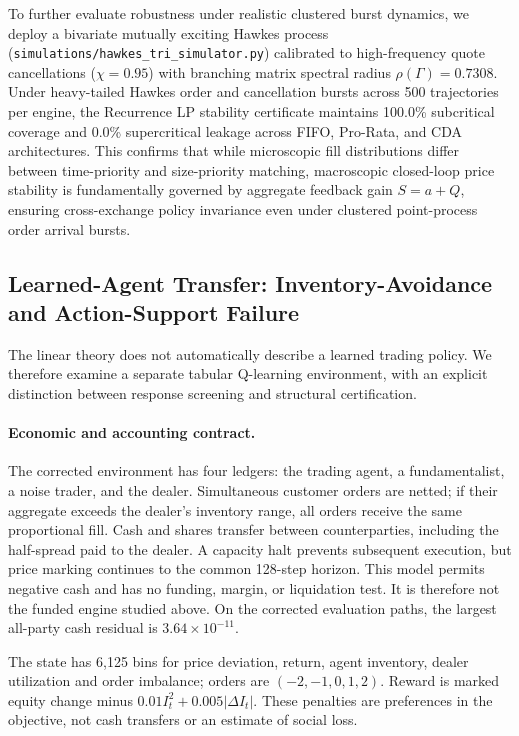 \documentclass[10pt,twocolumn,letterpaper]{article}
\theoremstyle{definition}
\theoremstyle{remark}
\begin{document}
To further evaluate robustness under realistic clustered burst dynamics, we deploy a bivariate mutually exciting Hawkes process (\texttt{simulations/hawkes\_tri\_simulator.py}) calibrated to high-frequency quote cancellations ($\chi = 0.95$) with branching matrix spectral radius $\rho(\Gamma) = 0.7308$. Under heavy-tailed Hawkes order and cancellation bursts across 500 trajectories per engine, the Recurrence LP stability certificate maintains 100.0\% subcritical coverage and 0.0\% supercritical leakage across FIFO, Pro-Rata, and CDA architectures. This confirms that while microscopic fill distributions differ between time-priority and size-priority matching, macroscopic closed-loop price stability is fundamentally governed by aggregate feedback gain $S = a + Q$, ensuring cross-exchange policy invariance even under clustered point-process order arrival bursts.

\subsection{Learned-Agent Transfer: Inventory-Avoidance and Action-Support Failure}
\label{sec:q_learning_transfer}
The linear theory does not automatically describe a learned trading policy. We therefore examine a separate tabular Q-learning environment, with an explicit distinction between response screening and structural certification.

\paragraph{Economic and accounting contract.}
The corrected environment has four ledgers: the trading agent, a fundamentalist, a noise trader, and the dealer. Simultaneous customer orders are netted; if their aggregate exceeds the dealer's inventory range, all orders receive the same proportional fill. Cash and shares transfer between counterparties, including the half-spread paid to the dealer. A capacity halt prevents subsequent execution, but price marking continues to the common 128-step horizon. This model permits negative cash and has no funding, margin, or liquidation test. It is therefore not the funded engine studied above. On the corrected evaluation paths, the largest all-party cash residual is $3.64\times10^{-11}$.

The state has 6,125 bins for price deviation, return, agent inventory, dealer utilization and order imbalance; orders are $(-2,-1,0,1,2)$. Reward is marked equity change minus $0.01 I_t^2+0.005|\Delta I_t|$. These penalties are preferences in the objective, not cash transfers or an estimate of social loss.
\end{document}
